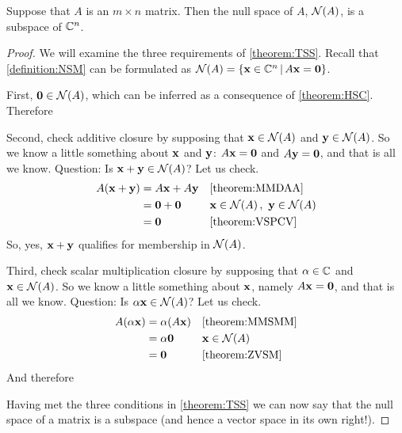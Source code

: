 \documentclass{ximera}
\begin{document}
\begin{theorem}
  \label{theorem:NSMS}

  Suppose that $A$ is an $m\times n$ matrix.  Then the null space of
  $A$, $\mathcal{N}\!\left(A\right)$, is a subspace of $\mathbb{C}^{n}$.
  
  \begin{proof}
    We will examine the three requirements of \ref{theorem:TSS}.
    Recall that \ref{definition:NSM} can be formulated as
    $\mathcal{N}\!\left(A\right)=\left\lbrace\mathbf{x}\in\mathbb{C}^{n}\,\middle|\,A\mathbf{x}=\mathbf{0}\right\rbrace$.

    First, $\mathbf{0}\in\mathcal{N}\!\left(A\right)$, which can be inferred as a
    consequence of \ref{theorem:HSC}.  Therefore
    \begin{multipleChoice}
    \end{multipleChoice}

    Second, check additive closure by supposing that
    $\mathbf{x}\in\mathcal{N}\!\left(A\right)$ and $\mathbf{y}\in\mathcal{N}\!\left(A\right)$.  So we know a
    little something about $\mathbf{x}$ and $\mathbf{y}$:
    $A\mathbf{x}=\mathbf{0}$ and $A\mathbf{y}=\mathbf{0}$, and that is
    all we know.  Question: Is $\mathbf{x}+\mathbf{y}\in\mathcal{N}\!\left(A\right)$?  Let us
    check.
    \begin{align*}
      A(\vect{x}+\vect{y})&=A\vect{x}+A\vect{y}&&\ref{theorem:MMDAA}\\
                          &=\zerovector+\zerovector&&\vect{x}\in\nsp{A},\ \vect{y}\in\nsp{A}\\
                          &=\zerovector&&\ref{theorem:VSPCV}
    \end{align*}
    So, yes, $\mathbf{x}+\mathbf{y}$ qualifies for membership in $\mathcal{N}\!\left(A\right)$.

    Third, check scalar multiplication closure by supposing that
    $\alpha\in\mathbb{C}$ and $\mathbf{x}\in\mathcal{N}\!\left(A\right)$.  So we know a
    little something about $\mathbf{x}$, namely $A\mathbf{x}=\mathbf{0}$,
    and that is all we know.  Question: Is $\alpha\mathbf{x}\in\mathcal{N}\!\left(A\right)$?
    Let us check.
    \begin{align*}
      A(\alpha\mathbf{x})&=\alpha(A\mathbf{x})&&\ref{theorem:MMSMM}\\
                       &=\alpha\mathbf{0}&&\mathbf{x}\in\mathcal{N}\!\left(A\right)\\
                       &=\mathbf{0}&&\ref{theorem:ZVSM}
    \end{align*}
    And therefore
    \begin{multipleChoice}
    \end{multipleChoice}

    Having met the three conditions in \ref{theorem:TSS} we can now
    say that the null space of a matrix is a subspace (and hence a
    vector space in its own right!).
  \end{proof}
\end{theorem}
\end{document}

